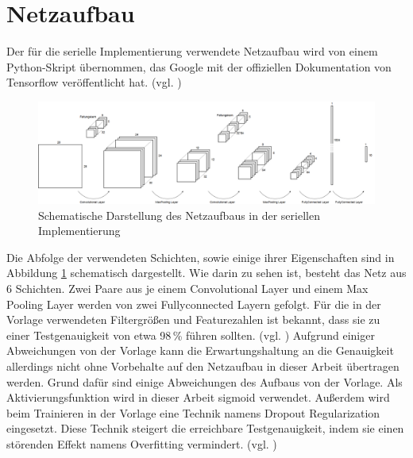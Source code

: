 \documentclass[../main.tex]{subfiles}
\begin{document}
\section{Netzaufbau}
Der für die serielle Implementierung verwendete Netzaufbau wird von einem Python-Skript übernommen, das Google mit der offiziellen Dokumentation von Tensorflow veröffentlicht hat. (vgl. \cite{tensorflowTutorial})
\begin{figure}
    \centering 
       \includegraphics[width=\textwidth]{../images/Benz/Aufbau_Netzwerk.png} 
    \caption {Schematische Darstellung des Netzaufbaus in der seriellen Implementierung} 
    \label{pic:AufbauNetzwerkSerial} 
\end{figure} 
Die Abfolge der verwendeten Schichten, sowie einige ihrer Eigenschaften sind in Abbildung \ref{pic:AufbauNetzwerkSerial} schematisch dargestellt. Wie darin zu sehen ist, besteht das Netz aus 6 Schichten. Zwei Paare aus je einem Convolutional Layer und einem Max Pooling Layer werden von zwei Fullyconnected Layern gefolgt. Für die in der Vorlage verwendeten Filtergrößen und Featurezahlen ist bekannt, dass sie zu einer Testgenauigkeit von etwa 98\,\% führen sollten. (vgl. \cite{tensorflowTutorial}) Aufgrund einiger Abweichungen von der Vorlage kann die Erwartungshaltung an die Genauigkeit allerdings nicht ohne Vorbehalte auf den Netzaufbau in dieser Arbeit übertragen werden. Grund dafür sind einige Abweichungen des Aufbaus von der Vorlage. Als Aktivierungsfunktion wird in dieser Arbeit sigmoid verwendet. Außerdem wird beim Trainieren in der Vorlage eine Technik namens Dropout Regularization eingesetzt. Diese Technik steigert die erreichbare Testgenauigkeit, indem sie einen störenden Effekt namens Overfitting vermindert. (vgl. \cite{neuralNetworksAndDeepLearning})
\end{document}
